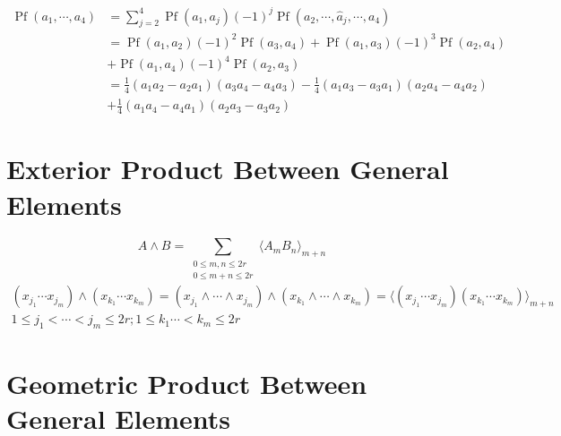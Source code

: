 \documentclass[aps, preprint]{revtex4}
\begin{document}
\begin{enumerate}
\begin{align}\ensuremath{\operatorname*{Pf}} \left (a_{1} ,\cdots  ,a_{4}\right ) &  =\sum _{j =2}^{4}\ensuremath{\operatorname*{Pf}} \left (a_{1} ,a_{j}\right ) \left ( -1\right )^{j} \ensuremath{\operatorname*{Pf}} \left (a_{2} ,\cdots  ,\hat{a}_{j} ,\cdots  ,a_{4}\right ) \\
 &  =\ensuremath{\operatorname*{Pf}} \left (a_{1} ,a_{2}\right ) \left ( -1\right )^{2} \ensuremath{\operatorname*{Pf}} \left (a_{3} ,a_{4}\right ) +\ensuremath{\operatorname*{Pf}} \left (a_{1} ,a_{3}\right ) \left ( -1\right )^{3} \ensuremath{\operatorname*{Pf}} \left (a_{2} ,a_{4}\right ) \\
 &  +\ensuremath{\operatorname*{Pf}} \left (a_{1} ,a_{4}\right ) \left ( -1\right )^{4} \ensuremath{\operatorname*{Pf}} \left (a_{2} ,a_{3}\right ) \\
 &  =\frac{1}{4} \left (a_{1} a_{2} -a_{2} a_{1}\right ) \left (a_{3} a_{4} -a_{4} a_{3}\right ) -\frac{1}{4} \left (a_{1} a_{3} -a_{3} a_{1}\right ) \left (a_{2} a_{4} -a_{4} a_{2}\right ) \\
 &  +\frac{1}{4} \left (a_{1} a_{4} -a_{4} a_{1}\right ) \left (a_{2} a_{3} -a_{3} a_{2}\right )\end{align}\end{enumerate}


\section{Exterior Product Between General Elements}
\begin{equation}A \wedge B =\sum _{\begin{array}{c}0 \leq m ,n \leq 2 r \\
0 \leq m +n \leq 2 r\end{array}} \langle A_{m} B_{n} \rangle _{m +n}
\end{equation}
\begin{gather}\left (x_{j_{1}} \cdots  x_{j_{m}}\right ) \wedge \left (x_{k_{1}} \cdots  x_{k_{m}}\right ) =\left (x_{j_{1}} \wedge \cdots  \wedge x_{j_{m}}\right ) \wedge \left (x_{k_{1}} \wedge \cdots  \wedge x_{k_{m}}\right ) = \langle \left (x_{j_{1}} \cdots  x_{j_{m}}\right ) \left (x_{k_{1}} \cdots  x_{k_{m}}\right ) \rangle _{m +n} \\
1 \leq j_{1} <\cdots  <j_{m} \leq 2 r ;1 \leq k_{1} \cdots  <k_{m} \leq 2 r\end{gather}

\section{Geometric Product Between General Elements}
\end{document}
